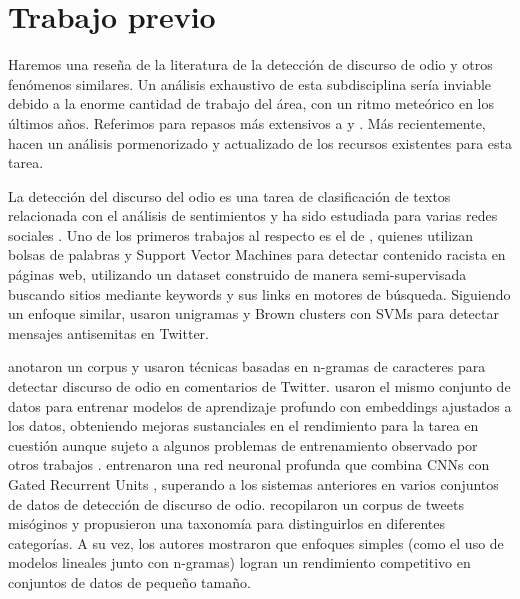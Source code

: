 

\section{Trabajo previo}

Haremos una reseña de la literatura de la detección de discurso de odio y otros fenómenos similares. Un análisis exhaustivo de esta subdisciplina sería inviable debido a la enorme cantidad de trabajo del área, con un ritmo meteórico en los últimos años. Referimos para repasos más extensivos a \citet{schmidt2017survey} y \citet{fortuna2018survey}. Más recientemente, \citet{poletto2021resources} hacen un análisis pormenorizado y actualizado de los recursos existentes para esta tarea.

La detección del discurso del odio es una tarea de clasificación de textos relacionada con el análisis de sentimientos y ha sido estudiada para varias redes sociales \cite{thelwall2008social, pak2010twitter, saleem2017web}. Uno de los primeros trabajos al respecto es el de \citet{greevy2004classifying}, quienes utilizan bolsas de palabras y Support Vector Machines para detectar contenido racista en páginas web, utilizando un dataset construido de manera semi-supervisada buscando sitios mediante keywords y sus links en motores de búsqueda. Siguiendo un enfoque similar, \citet{warner2012detecting} usaron unigramas y Brown clusters \cite{brown1992class} con SVMs para detectar mensajes antisemitas en Twitter.

\citet{waseem2016hateful} anotaron un corpus y usaron técnicas basadas en n-gramas de caracteres para detectar discurso de odio en comentarios de Twitter. \citet{badjatiya2017deep} usaron el mismo conjunto de datos para entrenar modelos de aprendizaje profundo con embeddings ajustados a los datos, obteniendo mejoras sustanciales en el rendimiento para la tarea en cuestión aunque sujeto a algunos problemas de entrenamiento observado por otros trabajos \cite{arango2019hate}. \citet{zhang2018detecting} entrenaron una red neuronal profunda que combina CNNs con Gated Recurrent Units \cite{cho2014learning}, superando a los sistemas anteriores en varios conjuntos de datos de detección de discurso de odio. \citet{anzovino2018automatic} recopilaron un corpus de tweets misóginos y propusieron una taxonomía para distinguirlos en diferentes categorías. A su vez, los autores mostraron que enfoques simples (como el uso de modelos lineales junto con n-gramas) logran un rendimiento competitivo en conjuntos de datos de pequeño tamaño.

